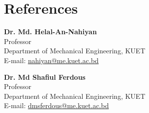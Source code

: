\documentclass[letterpaper,11pt]{article}
\begin{document}
\section{References}
\begin{minipage}[t]{0.45\textwidth}
\textbf{Dr. Md. Helal-An-Nahiyan} \\
Professor \\
Department of Mechanical Engineering, KUET \\
E-mail: \href{mailto:nahiyan@me.kuet.ac.bd}{nahiyan@me.kuet.ac.bd}
\end{minipage}
\hspace{47pt}
\begin{minipage}[t]{0.45\textwidth}
\textbf{Dr. Md Shafiul Ferdous} \\
Professor \\
Department of Mechanical Engineering, KUET \\
E-mail: \href{mailto:dmsferdous@me.kuet.ac.bd}{dmsferdous@me.kuet.ac.bd}\\
\end{minipage}
\end{document}
